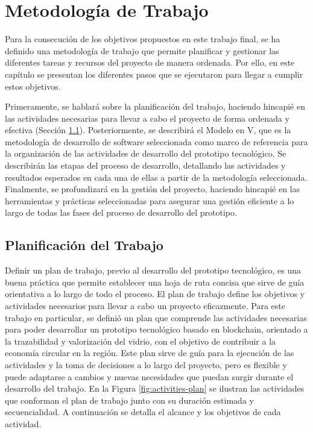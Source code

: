 \chapter[Metodología de Trabajo]{Metodología de Trabajo}
\label{cp:methodology}

\parindent0pt

Para la consecución de los objetivos propuestos en este trabajo final, se ha definido una metodología de trabajo que permite planificar y gestionar las diferentes tareas y recursos del proyecto de manera ordenada. Por ello, en este capítulo se presentan los diferentes pasos que se ejecutaron para llegar a cumplir estos objetivos. 

Primeramente, se hablará sobre la planificación del trabajo, haciendo hincapié en las actividades necesarias para llevar a cabo el proyecto de forma ordenada y efectiva (Sección \ref{sec:work-plan}). Posteriormente, se describirá el Modelo en V, que es la metodología de desarrollo de software seleccionada como marco de referencia para la organización de las actividades de desarrollo del prototipo tecnológico. Se describirán las etapas del proceso de desarrollo, detallando las actividades y resultados esperados en cada una de ellas a partir de la metodología seleccionada. Finalmente, se profundizará en la gestión del proyecto, haciendo hincapié en las herramientas y prácticas seleccionadas para asegurar una gestión eficiente a lo largo de todas las fases del proceso de desarrollo del prototipo.

\section{Planificación del Trabajo}
\label{sec:work-plan}

Definir un plan de trabajo, previo al desarrollo del prototipo tecnológico, es una buena práctica que permite establecer una hoja de ruta concisa que sirve de guía orientativa a lo largo de todo el proceso. El plan de trabajo define los objetivos y actividades necesarios para llevar a cabo un proyecto eficazmente. Para este trabajo en particular, se definió un plan que comprende las actividades necesarias para poder desarrollar un prototipo tecnológico basado en blockchain, orientado a la trazabilidad y valorización del vidrio, con el objetivo de contribuir a la economía circular en la región. Este plan sirve de guía para la ejecución de las actividades y la toma de decisiones a lo largo del proyecto, pero es flexible y puede adaptarse a cambios y nuevas necesidades que puedan surgir durante el desarrollo del trabajo. En la Figura \ref{fig:activities-plan} se ilustran las actividades que conforman el plan de trabajo junto con su duración estimada y secuencialidad. A continuación se detalla el alcance y los objetivos de cada actividad.

